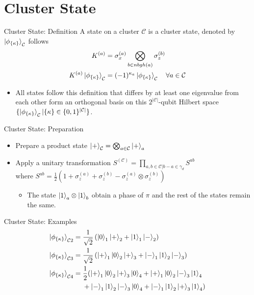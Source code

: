 \documentclass{beamer}
\begin{document}
\section{Cluster State}
\begin{frame}{Cluster State: Definition}
A state on a cluster $\mathcal{C}$ is a cluster state, denoted by $\ket{\phi_{\{\kappa\}}}_{\mathcal{C}}$ follows
    \begin{align*}
        K^{(a)} &= \sigma_x^{(a)} \bigotimes_{b \in nbgh(a)} \sigma_z^{(b)}\\
        K^{(a)}\ket{\phi_{\{\kappa\}}}_{\mathcal{C}} &= (-1)^{\kappa_a}\ket{\phi_{\{\kappa\}}}_{\mathcal{C}} \quad \forall a \in \mathcal{C}
    \end{align*}
    \begin{itemize}
        \item All states follow this definition that differs by at least one eigenvalue from each other form an orthogonal basis on this $2^{|\mathcal{C}|}$-qubit Hilbert space $\{\ket{\phi_{\{\kappa\}}}_{\mathcal{C}} \vert \{\kappa\} \in \{ 0, 1\}^{|\mathcal{C}|} \}$.
    \end{itemize}
\end{frame}


\begin{frame}{Cluster State: Preparation}
\begin{itemize}
    \item Prepare a product state $\ket{+}_{\mathcal{C}} = \bigotimes_{a \in \mathcal{C}} \ket{+}_a$
    \item Apply a unitary transformation $S^{(\mathcal{C})} = \prod_{a,b \in \mathcal{C} | b-a \in \gamma_d} S^{ab}$\\
    where $S^{ab} = \frac{1}{2}\left(1 + \sigma_z^{(a)} + \sigma_z^{(b)} - \sigma_z^{(a)} \otimes \sigma_z^{(b)}\right)$
    \begin{itemize}
        \item The state $\ket{1}_a \otimes \ket{1}_b$ obtain a phase of $\pi$ and the rest of the states remain the same.
    \end{itemize}
\end{itemize}
\end{frame}

\begin{frame}{Cluster State: Examples}
    \begin{align*}
        \ket{\phi_{\{\kappa\}}}_{\mathcal{C}2} &= \frac{1}{\sqrt{2}}\left(\ket{0}_1 \ket{+}_2 + \ket{1}_1\ket{-}_2\right)\\
        \ket{\phi_{\{\kappa\}}}_{\mathcal{C}3} &= \frac{1}{\sqrt{2}}\left(\ket{+}_1 \ket{0}_2 \ket{+}_3 + \ket{-}_1\ket{1}_2\ket{-}_3\right)\\
        \ket{\phi_{\{\kappa\}}}_{\mathcal{C}4} &= \frac{1}{2}(\ket{+}_1 \ket{0}_2 \ket{+}_3\ket{0}_4 + \ket{+}_1 \ket{0}_2 \ket{-}_3\ket{1}_4 \\
        &\ \quad + \ket{-}_1\ket{1}_2\ket{-}_3\ket{0}_4 + \ket{-}_1 \ket{1}_2 \ket{+}_3\ket{1}_4 )
    \end{align*}
\end{frame}
\end{document}
